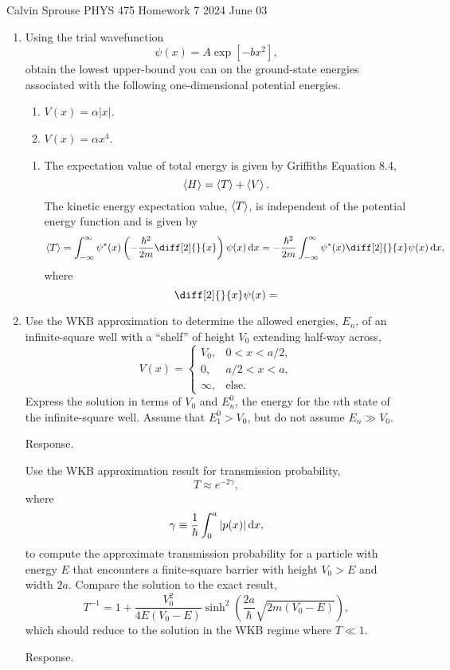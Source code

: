 \documentclass[a4paper, 12pt]{config/homework}
\begin{document}
\noindent
Calvin Sprouse \hfill PHYS 475 Homework 7 \hfill 2024 June 03
\bigskip

\begin{enumerate}
\item Using the trial wavefunction
\[\psi(x) = A\exp\left[-bx^2\right],\]
obtain the lowest upper-bound you can on the ground-state energies associated with the following one-dimensional potential energies.
\begin{enumerate}[label=(\alph*)]
\item \(V(x)=\alpha |x|\).
\item \(V(x)=\alpha x^4\).
\end{enumerate}
\bigskip
\begin{enumerate}[label=(\alph*)]
\item The expectation value of total energy is given by Griffiths Equation 8.4,
\[\left\langle H \right\rangle = \left\langle T \right\rangle + \left\langle V \right\rangle.\]
The kinetic energy expectation value, \(\left\langle T \right\rangle\), is independent of the potential energy function and is given by
\[\expval{T} = \defint{-\infty}{\infty}{\psi^*(x)\left(-\frac{\hbar^2}{2m}\diff[2]{}{x}\right)\psi(x)}{x} = -\frac{\hbar^2}{2m}\defint{-\infty}{\infty}{\psi^*(x)\diff[2]{}{x}\psi(x)}{x},\]
where
\[\diff[2]{}{x}\psi(x) = \]
\end{enumerate}

\pagebreak
\item Use the WKB approximation to determine the allowed energies, \(E_n\), of an infinite-square well with a ``shelf'' of height \(V_0\) extending half-way across,
\[V(x) = \begin{cases}
V_0, & 0 < x < a/2, \\ 0, & a/2 < x < a, \\ \infty, & \text{else}.
\end{cases}\]
Express the solution in terms of \(V_0\) and \(E_n^0\), the energy for the \(n\)th state of the infinite-square well. Assume that \(E_1^0 > V_0\), but do not assume \(E_n \gg V_0\).

\bigskip
Response.

\pagebreak
Use the WKB approximation result for transmission probability,
\[T \approx e^{-2\gamma},\]
where
\[\gamma \equiv \frac{1}{\hbar}\int_{0}^{a}{|p(x)| \, \text{d}x},\]
to compute the approximate transmission probability for a particle with energy \(E\) that encounters a finite-square barrier with height \(V_0 > E\) and width \(2a\). Compare the solution to the exact result,
\[T^{-1} = 1 + \frac{V_0^2}{4E(V_0-E)}\sinh^2\left(\frac{2a}{\hbar}\sqrt{2m(V_0-E)}\right),\]
which should reduce to the solution in the WKB regime where \(T\ll 1\).

\bigskip
Response.

\end{enumerate}
\end{document}
